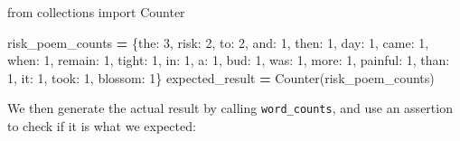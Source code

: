 \documentclass[
]{krantz}
\makeatletter
\newenvironment{Shaded}{\begin{snugshade}}{\end{snugshade}}
\newcommand{\DecValTok}[1]{\textcolor[rgb]{0.00,0.00,0.81}{#1}}
\newcommand{\ImportTok}[1]{#1}
\newcommand{\NormalTok}[1]{#1}
\newcommand{\OperatorTok}[1]{\textcolor[rgb]{0.81,0.36,0.00}{\textbf{#1}}}
\newcommand{\StringTok}[1]{\textcolor[rgb]{0.31,0.60,0.02}{#1}}
\newenvironment{kframe}{%
\medskip{}
\setlength{\fboxsep}{.8em}
 \def\at@end@of@kframe{}%
 \ifinner\ifhmode%
  \def\at@end@of@kframe{\end{minipage}}%
  \begin{minipage}{\columnwidth}%
 \fi\fi%
 \def\FrameCommand##1{\hskip\@totalleftmargin \hskip-\fboxsep
 \colorbox{shadecolor}{##1}\hskip-\fboxsep
     \hskip-\linewidth \hskip-\@totalleftmargin \hskip\columnwidth}%
 \MakeFramed {\advance\hsize-\width
   \@totalleftmargin\z@ \linewidth\hsize
   \@setminipage}}%
 {\par\unskip\endMakeFramed%
 \at@end@of@kframe}
\renewenvironment{Shaded}{\begin{kframe}}{\end{kframe}}
\makeatother
\begin{document}
\begin{Shaded}
\begin{Highlighting}[]
\ImportTok{from}\NormalTok{ collections }\ImportTok{import}\NormalTok{ Counter}

\NormalTok{risk\_poem\_counts }\OperatorTok{=}\NormalTok{ \{}\StringTok{\textquotesingle{}the\textquotesingle{}}\NormalTok{: }\DecValTok{3}\NormalTok{, }\StringTok{\textquotesingle{}risk\textquotesingle{}}\NormalTok{: }\DecValTok{2}\NormalTok{, }\StringTok{\textquotesingle{}to\textquotesingle{}}\NormalTok{: }\DecValTok{2}\NormalTok{, }\StringTok{\textquotesingle{}and\textquotesingle{}}\NormalTok{: }\DecValTok{1}\NormalTok{, }\StringTok{\textquotesingle{}then\textquotesingle{}}\NormalTok{: }\DecValTok{1}\NormalTok{,}
                    \StringTok{\textquotesingle{}day\textquotesingle{}}\NormalTok{: }\DecValTok{1}\NormalTok{, }\StringTok{\textquotesingle{}came\textquotesingle{}}\NormalTok{: }\DecValTok{1}\NormalTok{, }\StringTok{\textquotesingle{}when\textquotesingle{}}\NormalTok{: }\DecValTok{1}\NormalTok{, }\StringTok{\textquotesingle{}remain\textquotesingle{}}\NormalTok{: }\DecValTok{1}\NormalTok{, }\StringTok{\textquotesingle{}tight\textquotesingle{}}\NormalTok{: }\DecValTok{1}\NormalTok{,}
                    \StringTok{\textquotesingle{}in\textquotesingle{}}\NormalTok{: }\DecValTok{1}\NormalTok{, }\StringTok{\textquotesingle{}a\textquotesingle{}}\NormalTok{: }\DecValTok{1}\NormalTok{, }\StringTok{\textquotesingle{}bud\textquotesingle{}}\NormalTok{: }\DecValTok{1}\NormalTok{, }\StringTok{\textquotesingle{}was\textquotesingle{}}\NormalTok{: }\DecValTok{1}\NormalTok{, }\StringTok{\textquotesingle{}more\textquotesingle{}}\NormalTok{: }\DecValTok{1}\NormalTok{,}
                    \StringTok{\textquotesingle{}painful\textquotesingle{}}\NormalTok{: }\DecValTok{1}\NormalTok{, }\StringTok{\textquotesingle{}than\textquotesingle{}}\NormalTok{: }\DecValTok{1}\NormalTok{, }\StringTok{\textquotesingle{}it\textquotesingle{}}\NormalTok{: }\DecValTok{1}\NormalTok{, }\StringTok{\textquotesingle{}took\textquotesingle{}}\NormalTok{: }\DecValTok{1}\NormalTok{, }\StringTok{\textquotesingle{}blossom\textquotesingle{}}\NormalTok{: }\DecValTok{1}\NormalTok{\}}
\NormalTok{expected\_result }\OperatorTok{=}\NormalTok{ Counter(risk\_poem\_counts)}
\end{Highlighting}
\end{Shaded}

We then generate the actual result by calling \texttt{word\_counts},
and use an assertion to check if it is what we expected:
\end{document}
